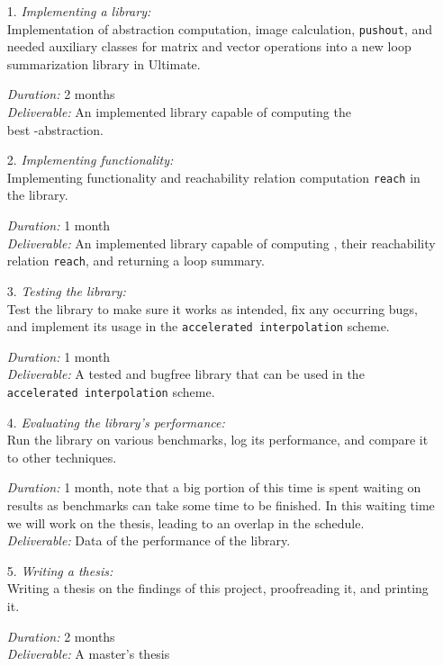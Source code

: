 \begin{itemize}
	\item[1.] \textsl{Implementing a \qvasr library:} \\
               Implementation of \qvasr abstraction computation, \qvasr image calculation, \texttt{pushout}, and needed auxiliary classes for matrix and vector operations into a new loop summarization library in Ultimate.

			  \textsl{Duration:} 2 months \\
			  \textsl{Deliverable:} An implemented library capable of computing the \\ best \qvasr-abstraction.

	\item[2.] \textsl{Implementing \qvasrs functionality:} \\
               Implementing \qvasrs functionality and reachability relation computation \texttt{reach} in the \qvasr library.

			  \textsl{Duration:} 1 month \\
			  \textsl{Deliverable:} An implemented library capable of computing \qvasrs, their reachability relation \texttt{reach}, and returning a loop summary.

	\item[3.] \textsl{Testing the library:} \\
               Test the library to make sure it works as intended, fix any occurring bugs, and implement its usage in the \texttt{accelerated interpolation} scheme.

			  \textsl{Duration:} 1 month \\
			  \textsl{Deliverable:} A tested and bugfree \qvasr library that can be used in the \\ \texttt{accelerated interpolation} scheme.

	\item[4.] \textsl{Evaluating the library's performance:} \\
               Run the library on various benchmarks, log its performance, and compare it to other techniques.

			  \textsl{Duration:} 1 month, note that a big portion of this time is spent waiting on results as benchmarks can take some time to be finished. In this waiting time we will work on the thesis, leading to an overlap in the schedule.\\
			  \textsl{Deliverable:} Data of the performance of the \qvasr library.

	\item[5.] \textsl{Writing a thesis:} \\
              Writing a thesis on the findings of this project, proofreading it, and printing it.

			  \textsl{Duration:} 2 months \\
			  \textsl{Deliverable:}	A master's thesis
\end{itemize}
